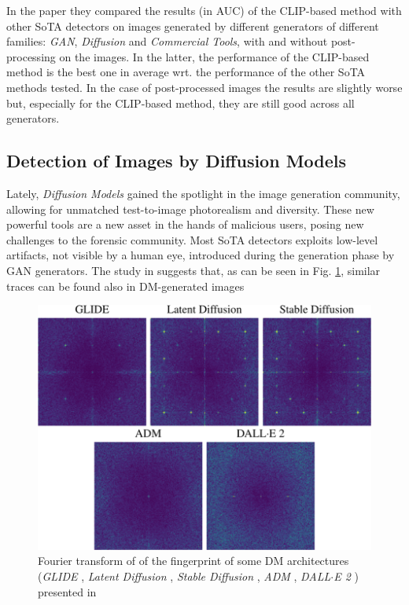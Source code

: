 \documentclass[conference]{IEEEtran} %
\begin{document}
        In the paper they compared the results (in AUC) of the CLIP-based method with other SoTA detectors on images generated by different generators of different families: \textit{GAN}, \textit{Diffusion} and \textit{Commercial Tools}, with and without post-processing on the images. In the latter, the performance of the CLIP-based method is the best one in average wrt. the performance of the other SoTA methods tested. In the case of post-processed images the results are slightly worse but, especially for the CLIP-based method, they are still good across all generators.

    \subsection{Detection of Images by Diffusion Models} 
        Lately, \textit{Diffusion Models} gained the spotlight in the image generation community, allowing for unmatched test-to-image photorealism and diversity. These new powerful tools are a new asset in the hands of malicious users, posing new challenges to the forensic community. Most SoTA detectors exploits low-level artifacts, not visible by a human eye, introduced during the generation phase by GAN generators. The study in \cite{corvi2023detection} suggests that, as can be seen in Fig. \ref{fig:pizza_fourier}, similar traces can be found also in DM-generated images

        \begin{figure}[h]
            \centering
            \includegraphics[width=0.6\linewidth]{Img/pizza_fourier.png}
            \caption{Fourier transform of of the fingerprint of some DM architectures (\textit{GLIDE} \cite{nichol2021glide}, \textit{Latent Diffusion} \cite{rombach2022high}, \textit{Stable Diffusion} \cite{stablediffusion2022}, \textit{ADM} \cite{dhariwal2021diffusion}, \textit{DALL$\cdot$E 2} \cite{ramesh2022hierarchical}) presented in \cite{corvi2023detection}}
            \label{fig:pizza_fourier}
        \end{figure}
\end{document}
